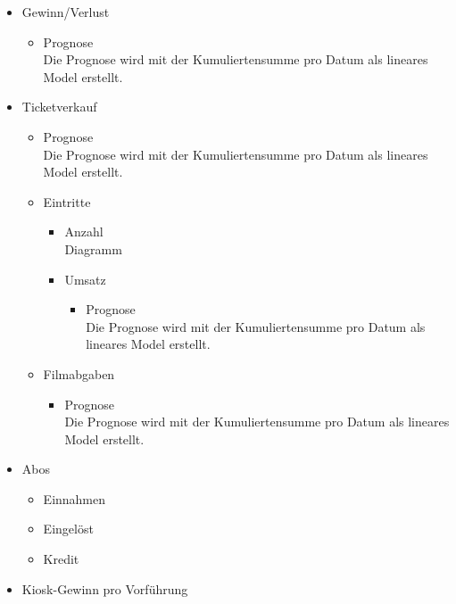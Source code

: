 \documentclass[
]{article}
\providecommand{\tightlist}{%
  \setlength{\itemsep}{0pt}\setlength{\parskip}{0pt}}
\begin{document}
\begin{itemize}
\tightlist
\item
  Gewinn/Verlust

  \begin{itemize}
  \tightlist
  \item
    Prognose\\
    Die Prognose wird mit der Kumuliertensumme pro Datum als lineares
    Model erstellt.
  \end{itemize}
\item
  Ticketverkauf

  \begin{itemize}
  \tightlist
  \item
    Prognose\\
    Die Prognose wird mit der Kumuliertensumme pro Datum als lineares
    Model erstellt.
  \item
    Eintritte

    \begin{itemize}
    \tightlist
    \item
      Anzahl\\
      Diagramm
    \item
      Umsatz

      \begin{itemize}
      \tightlist
      \item
        Prognose\\
        Die Prognose wird mit der Kumuliertensumme pro Datum als
        lineares Model erstellt.
      \end{itemize}
    \end{itemize}
  \item
    Filmabgaben

    \begin{itemize}
    \tightlist
    \item
      Prognose\\
      Die Prognose wird mit der Kumuliertensumme pro Datum als lineares
      Model erstellt.
    \end{itemize}
  \end{itemize}
\item
  Abos

  \begin{itemize}
  \tightlist
  \item
    Einnahmen
  \item
    Eingelöst
  \item
    Kredit
  \end{itemize}
\item
  Kiosk-Gewinn pro Vorführung


\end{itemize}
\end{document}
